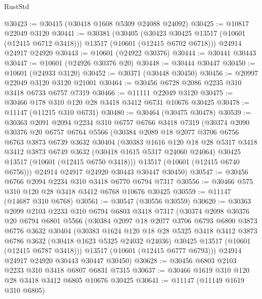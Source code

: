 \begin{lexlean}{RustStd}
\begin{coremodule}
@30423 := @30415 (@30418 @1608 @5309 @24088 @24092)
@30425 := @10817 @22049 @3120
@30441 := @30381
    (@30405
      (@30423 @30425 @13517 (@10601 (@12415 @6712 @3418)))
      @13517
      (@10601 (@12415 @6702 @6718)))
    @24914
    @24917
    @24920
@30443 := @10601 (@24922 @30376)
@30444 := @30441 @30443
@30447 := @10601 (@24926 @30376 @20)
@30448 := @30444 @30447
@30450 := @10601 (@24933 @3120)
@30452 := @30371 (@30448 @30450)
@30456 := @20997 @22049 @3120 @3120 @21001
@30464 := @30456 @6728 @2086 @2235 @310 @3418 @6733 @6757 @7319
@30466 := @11111 @22049 @3120
@30475 := @30466 @178 @310 @120 @28 @3418 @3412 @6731 @10676 @30425
@30478 := @11147 (@11215 @310 @6731)
@30480 := @30464 (@30475 @30478)
@30539 := @30363
    @2091
    @2094
    @2234
    @310
    @6757
    @6766
    @3418
    @7319
    (@30374
      @2090
      @30376
      @20
      @6757
      @6764
      @5566
      (@30384
        @2089
        @18
        @2077
        @3706
        @6756
        @6763
        @3873
        @6739
        @3632
        @30404
        (@30383
          @1616
          @120
          @18
          @28
          @5317
          @3418
          @3412
          @3873
          @6749
          @3632
          (@30418 @1615 @5317 @24060 @24064)
          @30425
          @13517
          (@10601 (@12415 @6750 @3418)))
        @13517
        (@10601 (@12415 @6740 @6756)))
      @24914
      @24917
      @24920
      @30443
      @30447
      @30450)
@30547 := @30456 @6766 @2094 @2234 @310 @3418 @6770 @6794 @7317
@30556 := @30466 @575 @310 @120 @28 @3418 @3412 @6768 @10676 @30425
@30559 := @11147 (@14687 @310 @6768)
@30561 := @30547 (@30556 @30559)
@30620 := @30363
    @2099
    @2103
    @2233
    @310
    @6794
    @6803
    @3418
    @7317
    (@30374
      @2098
      @30376
      @20
      @6794
      @6801
      @5566
      (@30384
        @2097
        @18
        @2077
        @3706
        @6793
        @6800
        @3873
        @6776
        @3632
        @30404
        (@30383
          @1624
          @120
          @18
          @28
          @5325
          @3418
          @3412
          @3873
          @6786
          @3632
          (@30418 @1623 @5325 @24032 @24036)
          @30425
          @13517
          (@10601 (@12415 @6787 @3418)))
        @13517
        (@10601 (@12415 @6777 @6793)))
      @24914
      @24917
      @24920
      @30443
      @30447
      @30450)
@30628 := @30456 @6803 @2103 @2233 @310 @3418 @6807 @6831 @7315
@30637 := @30466 @1619 @310 @120 @28 @3418 @3412 @6805 @10676 @30425
@30641 := @11147 (@11149 @1619 @310 @6805)

\end{coremodule}
\end{lexlean}
